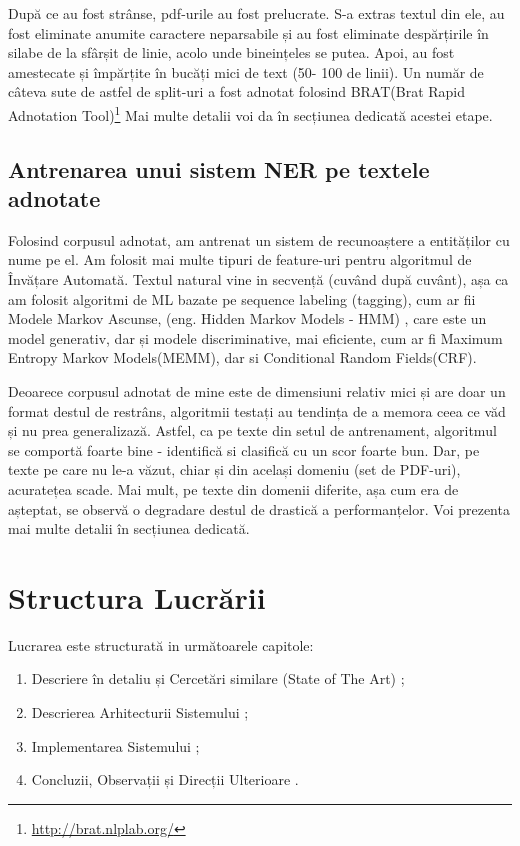 După ce au fost strânse, pdf-urile au fost prelucrate. S-a extras textul din ele, au fost eliminate anumite caractere neparsabile și au fost eliminate despărțirile în silabe de la sfârșit de linie, acolo unde bineințeles se putea. Apoi, au fost amestecate și împărțite în bucăți mici de text (50- 100 de linii). Un număr de câteva sute de astfel de split-uri a fost adnotat folosind BRAT(Brat Rapid Adnotation Tool)\footnote{\url{http://brat.nlplab.org/}} Mai multe detalii voi da în secțiunea dedicată acestei etape.

\subsection{Antrenarea unui sistem NER pe textele adnotate}

Folosind corpusul adnotat, am antrenat un sistem de recunoaștere a entităților cu nume pe el. Am folosit mai multe tipuri de feature-uri pentru algoritmul de Învățare Automată. Textul natural vine in secvență (cuvând după cuvânt), așa ca am folosit algoritmi de ML bazate pe sequence labeling (tagging), cum ar fii Modele Markov Ascunse, (eng. Hidden Markov Models - HMM) , care este un model generativ, dar și modele discriminative, mai eficiente, cum ar fi Maximum Entropy Markov Models(MEMM), dar si Conditional Random Fields(CRF).


Deoarece corpusul adnotat de mine este de dimensiuni relativ mici și are doar un format destul de restrâns, algoritmii testați au tendința de a memora ceea ce văd și nu prea generalizază. Astfel, ca pe texte din setul de antrenament, algoritmul se comportă foarte bine - identifică si clasifică cu un scor foarte bun. Dar, pe texte pe care nu le-a văzut, chiar și din același domeniu (set de PDF-uri), acuratețea scade. Mai mult, pe texte din domenii diferite, așa cum era de așteptat, se observă o degradare destul de drastică a performanțelor. Voi prezenta mai multe detalii în secțiunea dedicată.

\section{Structura Lucrării}

Lucrarea este structurată in următoarele capitole:

\begin{enumerate}

\item Descriere în detaliu și Cercetări similare (State of The Art)  ;
\item Descrierea Arhitecturii Sistemului ;
\item Implementarea Sistemului ;
\item Concluzii, Observații și Direcții Ulterioare .

\end{enumerate}

